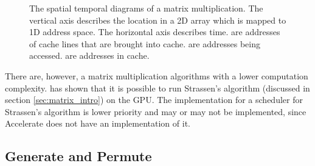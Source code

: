 \documentclass{article}
\begin{document}
\begin{figure}
{
        \label{fig:st_matrix_column}
    }

    \caption{
        The spatial temporal diagrams of a matrix multiplication. The vertical axis describes the location in a 2D array which is mapped to 1D address space. The horizontal axis describes time.  are addresses of cache lines that are brought into cache.  are addresses being accessed.  are addresses in cache.
    }
    \label{fig:st_matrix}
\end{figure}

There are, however, a matrix multiplication algorithms with a lower computation complexity. 
\citet{li2011strassen} has shown that it is possible to run Strassen's algorithm (discussed in section \ref{sec:matrix_intro}) on the GPU.
The implementation for a scheduler for Strassen's algorithm is lower priority and may or may not be implemented, since Accelerate does not have an implementation of it.

\subsection{Generate and Permute}
\end{document}
